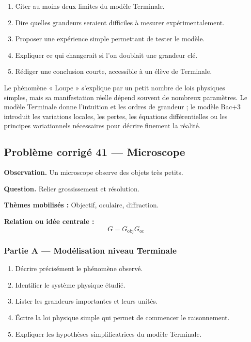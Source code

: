 \documentclass[11pt,a4paper]{article}
\begin{document}
\begin{enumerate}
  \item Citer au moins deux limites du modèle Terminale.
  \item Dire quelles grandeurs seraient difficiles à mesurer expérimentalement.
  \item Proposer une expérience simple permettant de tester le modèle.
  \item Expliquer ce qui changerait si l'on doublait une grandeur clé.
  \item Rédiger une conclusion courte, accessible à un élève de Terminale.
\end{enumerate}

\begin{corrigebox}
Le phénomène « Loupe » s'explique par un petit nombre de lois physiques simples, mais sa manifestation réelle dépend souvent de nombreux paramètres. Le modèle Terminale donne l'intuition et les ordres de grandeur ; le modèle Bac+3 introduit les variations locales, les pertes, les équations différentielles ou les principes variationnels nécessaires pour décrire finement la réalité.
\end{corrigebox}

\subsection{Problème corrigé 41 — Microscope}

\begin{exercicebox}
\textbf{Observation.} Un microscope observe des objets très petits.

\medskip
\textbf{Question.} Relier grossissement et résolution.

\medskip
\textbf{Thèmes mobilisés :} Objectif, oculaire, diffraction.

\medskip
\textbf{Relation ou idée centrale :}
\[
G=G_{\mathrm{obj}}G_{\mathrm{oc}}
\]
\end{exercicebox}

\subsubsection*{Partie A — Modélisation niveau Terminale}

\begin{enumerate}
  \item Décrire précisément le phénomène observé.
  \item Identifier le système physique étudié.
  \item Lister les grandeurs importantes et leurs unités.
  \item Écrire la loi physique simple qui permet de commencer le raisonnement.
  \item Expliquer les hypothèses simplificatrices du modèle Terminale.
\end{enumerate}
\end{document}
